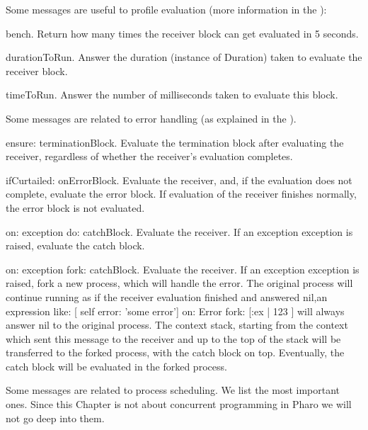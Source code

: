 \documentclass[a4paper,10pt,twoside]{book}
\begin{document}
Some messages are useful to profile evaluation (more information in the ):

\begin{description}
\item{\textsf{bench}}. Return how many times the receiver block can get evaluated in 5 seconds.

\item{\textsf{durationToRun}}. Answer the duration (instance of Duration) taken to evaluate the receiver block.

\item{\textsf{timeToRun}}. Answer the number of milliseconds taken to evaluate this block.
\end{description}


Some messages are related to error handling (as explained in the ).

\begin{description}
\item{\textsf{ensure: terminationBlock}}. Evaluate the termination block after evaluating the receiver, regardless of whether the receiver's evaluation completes.
\item{\textsf{ifCurtailed: onErrorBlock}}. Evaluate the receiver, and, if the evaluation does not complete, evaluate the error block. If evaluation of the receiver finishes normally, the error block is not evaluated.

\item{\textsf{on: exception do: catchBlock}}. Evaluate the receiver. If an exception \textsf{exception} is raised, evaluate the catch block.

\item{\textsf{on: exception fork: catchBlock}}. Evaluate the receiver. If an exception \textsf{exception} is raised, fork a new process, which will handle the error. The original process will continue running as if the receiver evaluation finished and answered nil,\ie  an expression like: \textsf{[ self error: 'some error'] on: Error fork: [:ex |  123 ]} will always answer nil to the original process. The context stack, starting from the context which sent this message to the receiver and up to the top of the stack will be transferred to the forked process, with the catch block on top. Eventually, the catch block will be evaluated in the forked process.
\end{description}


Some messages are related to process scheduling. We list the most important ones. Since this Chapter is not about concurrent programming in Pharo we will not go deep into them.
\end{document}
